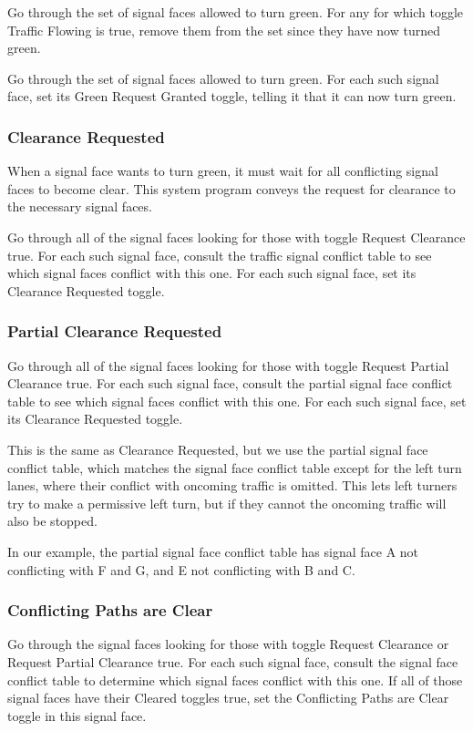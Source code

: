 \documentclass[letterpaper,twoside]{article}
\begin{document}
Go through the set of signal faces allowed to turn green.  For any
for which toggle Traffic Flowing is true, remove them from the set
since they have now turned green.

Go through the set of signal faces allowed to turn green.  For each
such signal face, set its Green Request Granted toggle, telling it
that it can now turn green.

\subsubsection{Clearance Requested}

When a signal face wants to turn green, it must wait for all conflicting
signal faces to become clear.  This system program conveys the request
for clearance to the necessary signal faces.

Go through all of the signal faces looking for those with toggle
Request Clearance true.  For each such signal face, consult the traffic
signal conflict table to see which signal faces conflict with this one.
For each such signal face, set its Clearance Requested toggle.

\subsubsection{Partial Clearance Requested}

Go through all of the signal faces looking for those with toggle
Request Partial Clearance true.  For each such signal face, consult the
partial signal face conflict table to see which signal faces conflict
with this one.
For each such signal face, set its Clearance Requested toggle.

This is the same as Clearance Requested, but we use the partial signal face
conflict table, which matches the signal face conflict table except
for the left turn lanes, where their conflict with oncoming traffic is
omitted.
This lets left turners try to make a
permissive left turn, but if they cannot the oncoming traffic will also
be stopped.

In our example, the partial signal face conflict table
has signal face A not conflicting with F and G, and E not
conflicting with B and C.  

\subsubsection{Conflicting Paths are Clear}

Go through the signal faces looking for those with toggle Request Clearance
or Request Partial Clearance
true.  For each such signal face, consult the signal face conflict table
to determine which signal faces conflict with this one.  If all of those
signal faces have their Cleared toggles true, set the Conflicting Paths
are Clear toggle in this signal face.
\end{document}
